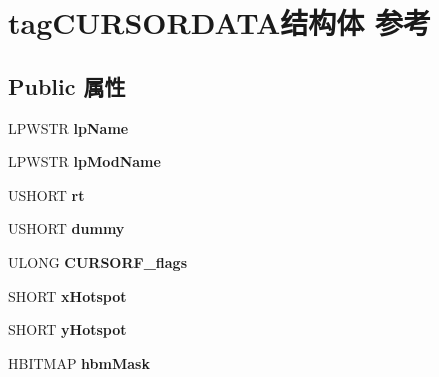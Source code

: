 \hypertarget{structtag_c_u_r_s_o_r_d_a_t_a}{}\section{tag\+C\+U\+R\+S\+O\+R\+D\+A\+T\+A结构体 参考}
\label{structtag_c_u_r_s_o_r_d_a_t_a}
\subsection*{Public 属性}
\begin{DoxyCompactItemize}
\item 
\mbox{\label{structtag_c_u_r_s_o_r_d_a_t_a_a0fd184ff3b93a02a9fdb67b12504fda4}} 
L\+P\+W\+S\+TR {\bfseries lp\+Name}
\item 
\mbox{\label{structtag_c_u_r_s_o_r_d_a_t_a_af9b115ef0480e51026f3d8f5568e7e28}} 
L\+P\+W\+S\+TR {\bfseries lp\+Mod\+Name}
\item 
\mbox{\label{structtag_c_u_r_s_o_r_d_a_t_a_ae2b0160e53bb0a9e75bda01a890ad0ee}} 
U\+S\+H\+O\+RT {\bfseries rt}
\item 
\mbox{\label{structtag_c_u_r_s_o_r_d_a_t_a_a8df16170c26e3a30e874d29001e38e0e}} 
U\+S\+H\+O\+RT {\bfseries dummy}
\item 
\mbox{\label{structtag_c_u_r_s_o_r_d_a_t_a_a4324b7710369faed81410580d68f2c5c}} 
U\+L\+O\+NG {\bfseries C\+U\+R\+S\+O\+R\+F\+\_\+flags}
\item 
\mbox{\label{structtag_c_u_r_s_o_r_d_a_t_a_ad18c89a895544c73171594ee3cd2446d}} 
S\+H\+O\+RT {\bfseries x\+Hotspot}
\item 
\mbox{\label{structtag_c_u_r_s_o_r_d_a_t_a_af4a536e4a49c25a1e7069141e2ee7649}} 
S\+H\+O\+RT {\bfseries y\+Hotspot}
\item 
\mbox{\label{structtag_c_u_r_s_o_r_d_a_t_a_a31a86898999c4a012695ba1ca2e515db}} 
H\+B\+I\+T\+M\+AP {\bfseries hbm\+Mask}
\item 

\end{DoxyCompactItemize}
